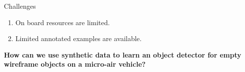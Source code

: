 \documentclass{beamer}
\begin{document}
\begin{darkframes}
\begin{frame}
\begin{block}{Challenges}
\begin{enumerate}
		\item On board resources are limited.
		
		\item Limited annotated examples are available.
		
	\end{enumerate}
\end{block}
\end{frame}

	\begin{frame}	
	\textbf{How can we use synthetic data to learn an object detector for empty wireframe objects on a micro-air vehicle?\\}
	\bigskip

	\centering
	\end{frame}


\end{darkframes}
\end{document}
